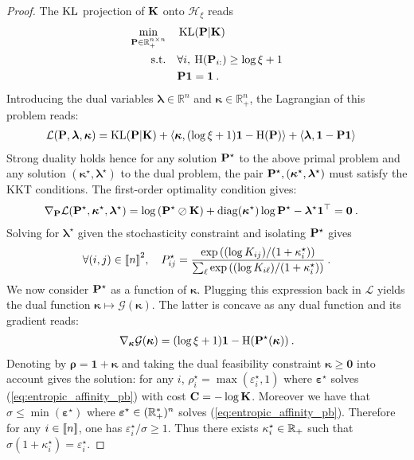 \begin{proof}
The $\operatorname{KL}$ projection of $\mathbf{K}$ onto $\mathcal{H}_{\xi}$ reads
\begin{align}
    \min_{{\mathbf{P}} \in \mathbb{R}_+^{n \times n}} \quad &\operatorname{KL}({\mathbf{P}} | \mathbf{K}) \\
    \text{s.t.} \quad &\forall i, \: \operatorname{H}({\mathbf{P}}_{i:}) \geq \log{\xi} + 1 \\
    & {\mathbf{P}} \bm{1} = \bm{1} \:.
\end{align}
Introducing the dual variables $\bm{\lambda} \in \mathbb{R}^n$ and $\bm{\kappa} \in \mathbb{R}_+^n$, the Lagrangian of this problem reads:
\begin{align}
    \mathcal{L}({\mathbf{P}}, \bm{\lambda}, \bm{\kappa}) &=  \operatorname{KL}({\mathbf{P}} | \mathbf{K})  + \langle \bm{\kappa}, (\log{\xi} + 1) \bm{1} - \operatorname{H}({\mathbf{P}}) \rangle + \langle \bm{\lambda}, \bm{1} - {\mathbf{P}} \bm{1} \rangle
\end{align}
Strong duality holds hence for any solution ${\mathbf{P}}^\star$ to the above primal problem and any solution $(\bm{\kappa}^\star, \bm{\lambda}^\star)$ to the dual problem, the pair ${\mathbf{P}}^\star, (\bm{\kappa}^\star, \bm{\lambda}^\star)$ must satisfy the KKT conditions. The first-order optimality condition gives:
\begin{align}
    \nabla_{{\mathbf{P}}} \mathcal{L} ({\mathbf{P}}^\star, \bm{\kappa}^\star, \bm{\lambda}^\star) &= \log \left( {\mathbf{P}}^\star \oslash \mathbf{K} \right) + \operatorname{diag}(\bm{\kappa}^\star)\log{{\mathbf{P}}^\star} - \bm{\lambda}^\star \bm{1}^\top = \bm{0} \:.
\end{align}
Solving for $\bm{\lambda}^\star$ given the stochasticity constraint and isolating ${\mathbf{P}}^\star$ gives
\begin{align}
    \forall (i,j) \in {[\![n]\!]}^2, \quad P^\star_{ij} = \frac{\exp{((\log K_{ij})/(1 + \kappa^\star_i)})}{\sum_\ell \exp{((\log K_{i\ell})/(1 + \kappa^\star_i)})} \:.
\end{align}
We now consider ${\mathbf{P}}^\star$ as a function of $\bm{\kappa}$. Plugging this expression back in $\mathcal{L}$ yields the dual function $\bm{\kappa} \mapsto \mathcal{G}(\bm{\kappa})$. The latter is concave as any dual function and its gradient reads:
\begin{align}
    \nabla_{\bm{\kappa}} \mathcal{G}(\bm{\kappa}) = (\log \xi + 1 )\bm{1} - \operatorname{H}({\mathbf{P}}^\star(\bm{\kappa})) \:.
\end{align}
Denoting by $\bm{\rho} = \bm{1} + \bm{\kappa}$ and taking the dual feasibility constraint $\bm{\kappa} \bm{\geq} \bm{0}$ into account gives the solution: for any $i$, $\rho^\star_i = \max(\varepsilon^\star_i, 1)$ where $\bm{\varepsilon}^\star$ solves (\ref{eq:entropic_affinity_pb}) with cost $\mathbf{C} = -\log \mathbf{K}$.
Moreover we have that $\sigma \leq \min(\bm{\varepsilon}^\star)$ where $\bm{\varepsilon}^\star \in (\mathbb{R}^*_+)^n$ solves (\ref{eq:entropic_affinity_pb}). Therefore for any $i \in {[\![n]\!]}$, one has $\varepsilon_i^\star / \sigma \geq 1$. Thus there exists $\kappa_i^\star \in \mathbb{R}_+$ such that $\sigma (1 + \kappa_i^\star) = \varepsilon_i^\star$. 


\end{proof}
